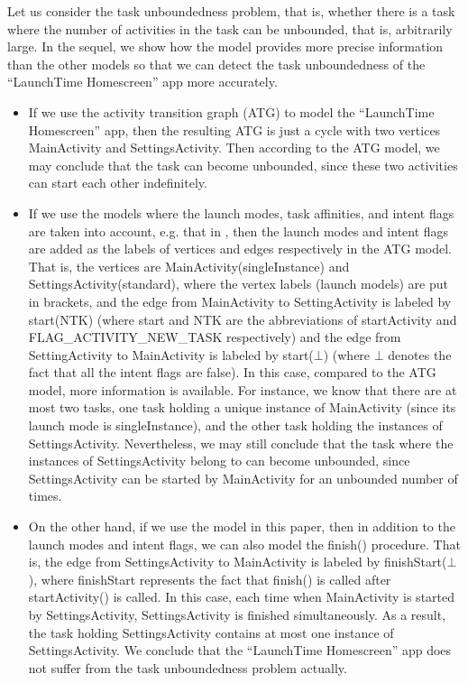 
Let us consider the task unboundedness problem, that is, whether there is a task where the number of activities in the task can be unbounded, that is, arbitrarily large. In the sequel, we show how the {\AMASS} model provides more precise information than the other models so that we can detect the task unboundedness of  the ``LaunchTime Homescreen'' app more accurately. 
\begin{itemize}
\item If we use the activity transition graph (ATG) to model the ``LaunchTime Homescreen'' app, then the resulting ATG is just a cycle with two vertices MainActivity and SettingsActivity. Then according to the ATG model, we may conclude that the task can become unbounded, since these two activities can start each other indefinitely. 
%
\item If we use the models where the launch modes, task affinities, and intent flags are taken into account, e.g. that in \cite{LHR17}, then the launch modes and intent flags are added as the labels of vertices and edges respectively in the ATG model. That is, the vertices are MainActivity(singleInstance) and SettingsActivity(standard), where the vertex labels (launch models) are put in brackets, and the edge from MainActivity to SettingActivity is labeled by start(NTK) (where start and NTK are the abbreviations of startActivity and FLAG\_ACTIVITY\_NEW\_TASK respectively) and the edge from SettingActivity to MainActivity is labeled by start($\bot$) (where $\bot$ denotes the fact that all the intent flags are false). In this case, compared to the ATG model, more information is available. For instance, we know that there are at most two tasks, one task holding a unique instance of MainActivity (since its launch mode is singleInstance), and the other task holding the instances of SettingsActivity. Nevertheless, we may still conclude that the task where the instances of SettingsActivity belong to can become unbounded, since SettingsActivity can be started by MainActivity for an unbounded number of times. 
%
\item On the other hand, if we use the {\AMASS} model in this paper, then in addition to the launch modes and intent flags, we can also model the finish() procedure. That is, the edge from SettingsActivity to MainActivity is labeled by finishStart($\bot$), where finishStart represents the fact that finish() is called after startActivity() is called. In this case, each time when MainActivity is started by SettingsActivity, SettingsActivity is finished simultaneously. As a result, the task holding SettingsActivity contains at most one instance of SettingsActivity. We conclude that the ``LaunchTime Homescreen'' app does not suffer from the task unboundedness problem actually. 
\end{itemize}

